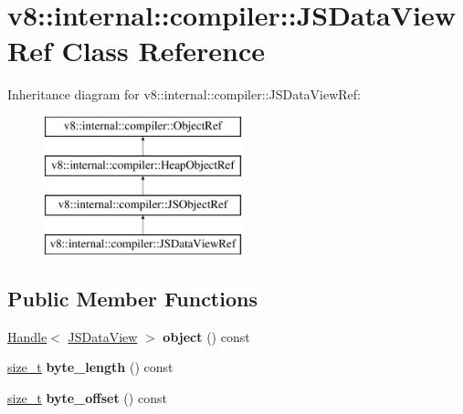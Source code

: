 \hypertarget{classv8_1_1internal_1_1compiler_1_1JSDataViewRef}{}\section{v8\+:\+:internal\+:\+:compiler\+:\+:J\+S\+Data\+View\+Ref Class Reference}
\label{classv8_1_1internal_1_1compiler_1_1JSDataViewRef}
Inheritance diagram for v8\+:\+:internal\+:\+:compiler\+:\+:J\+S\+Data\+View\+Ref\+:\begin{figure}[H]
\begin{center}
\leavevmode
\includegraphics[height=4.000000cm]{classv8_1_1internal_1_1compiler_1_1JSDataViewRef}
\end{center}
\end{figure}
\subsection*{Public Member Functions}
\begin{DoxyCompactItemize}
\item 
\mbox{\label{classv8_1_1internal_1_1compiler_1_1JSDataViewRef_a76d74462305e9df29363c45dd0d470cb}} 
\mbox{\hyperlink{classv8_1_1internal_1_1Handle}{Handle}}$<$ \mbox{\hyperlink{classv8_1_1internal_1_1JSDataView}{J\+S\+Data\+View}} $>$ {\bfseries object} () const
\item 
\mbox{\label{classv8_1_1internal_1_1compiler_1_1JSDataViewRef_af3be6d1a48cb03c5cf09f9d14024d6df}} 
\mbox{\hyperlink{classsize__t}{size\+\_\+t}} {\bfseries byte\+\_\+length} () const
\item 
\mbox{\label{classv8_1_1internal_1_1compiler_1_1JSDataViewRef_a06405fadc15c2d47d5de70618d4eb231}} 
\mbox{\hyperlink{classsize__t}{size\+\_\+t}} {\bfseries byte\+\_\+offset} () const
\end{DoxyCompactItemize}
